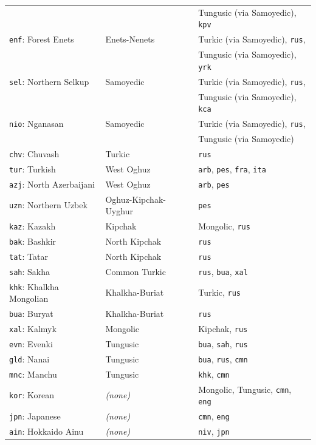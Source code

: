 \begin{center}
\begin{longtable}{lll}
& & Tungusic (via Samoyedic), \texttt{kpv} \\
\texttt{enf}: Forest Enets & Enets-Nenets & Turkic (via Samoyedic), \texttt{rus},\\
& & Tungusic (via Samoyedic), \texttt{yrk} \\
\texttt{sel}: Northern Selkup & Samoyedic & Turkic (via Samoyedic), \texttt{rus},\\
& & Tungusic (via Samoyedic), \texttt{kca} \\
\texttt{nio}: Nganasan & Samoyedic & Turkic (via Samoyedic), \texttt{rus},\\
& & Tungusic (via Samoyedic) \\
\hline
\texttt{chv}: Chuvash & Turkic & \texttt{rus}\\
\texttt{tur}: Turkish & West Oghuz & \texttt{arb}, \texttt{pes}, \texttt{fra}, \texttt{ita}\\
\texttt{azj}: North Azerbaijani & West Oghuz & \texttt{arb}, \texttt{pes}\\
\texttt{uzn}: Northern Uzbek & Oghuz-Kipchak-Uyghur & \texttt{pes}\\
\texttt{kaz}: Kazakh & Kipchak & Mongolic, \texttt{rus}\\
\texttt{bak}: Bashkir & North Kipchak & \texttt{rus}\\
\texttt{tat}: Tatar & North Kipchak & \texttt{rus}\\
\texttt{sah}: Sakha & Common Turkic & \texttt{rus}, \texttt{bua}, \texttt{xal}\\
\hline
\texttt{khk}: Khalkha Mongolian & Khalkha-Buriat & Turkic, \texttt{rus}\\
\texttt{bua}: Buryat & Khalkha-Buriat & \texttt{rus}\\
\texttt{xal}: Kalmyk & Mongolic & Kipchak, \texttt{rus}\\
\hline
\texttt{evn}: Evenki & Tungusic & \texttt{bua}, \texttt{sah}, \texttt{rus}\\
\texttt{gld}: Nanai & Tungusic & \texttt{bua}, \texttt{rus}, \texttt{cmn}\\
\texttt{mnc}: Manchu & Tungusic & \texttt{khk}, \texttt{cmn}\\
\hline
\texttt{kor}: Korean & \textit{(none)} & Mongolic, Tungusic, \texttt{cmn}, \texttt{eng}\\
\hline
\texttt{jpn}: Japanese & \textit{(none)} & \texttt{cmn}, \texttt{eng}\\
\hline
\texttt{ain}: Hokkaido Ainu & \textit{(none)} & \texttt{niv}, \texttt{jpn}\\
\hline

\end{longtable}
\end{center}
